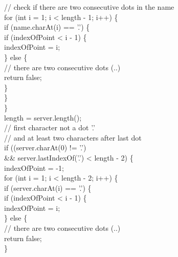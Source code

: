 \begin{java}
\jtabf                        // check if there are two consecutive dots in the name\\
\jtabf                        for (int i = 1; i < length - 1; i++) \{\\
\jtabf                                if (name.charAt(i) == '.') \{\\
\jtabf                                        if (indexOfPoint < i - 1) \{\\
\jtabf                                                indexOfPoint = i;\\
\jtabf                                        \} else \{\\
\jtabf                        // there are two consecutive dots (..)\\
\jtabf                                                return false;\\
\jtabf                                        \}\\
\jtabf                                \}\\
\jtabf                        \}\\
\jtabf                        length = server.length();\\
\jtabf                        // first character not a dot '.'\\ 
\jtabf		              // and at least two characters after last dot\\
\jtabf                        if ((server.charAt(0) != '.')\\
\jtabf			      \&\& server.lastIndexOf('.') < length - 2) \{\\
\jtabf                                indexOfPoint = -1;\\
\jtabf                                for (int i = 1; i < length - 2; i++) \{\\
\jtabf                                        if (server.charAt(i) == '.') \{\\
\jtabf                                                if (indexOfPoint < i - 1) \{ \\
\jtabf                                                    indexOfPoint = i;\\
\jtabf                                                \} else \{\\
\jtabf                                // there are two consecutive dots (..)\\
\jtabf                                                        return false;\\
\jtabf                                                \}\\

\end{java}
